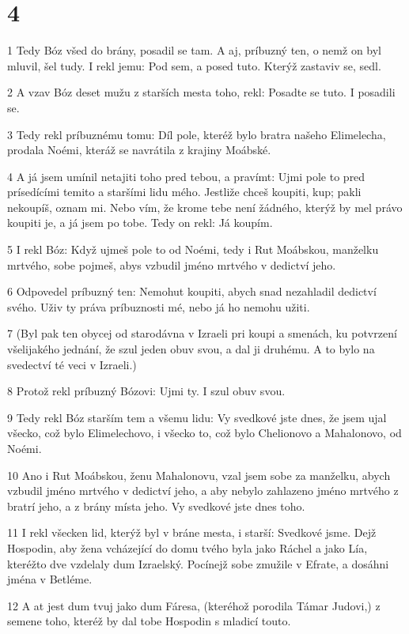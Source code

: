 \chapter{4}

\par 1 Tedy Bóz všed do brány, posadil se tam. A aj, príbuzný ten, o nemž on byl mluvil, šel tudy. I rekl jemu: Pod sem, a posed tuto. Kterýž zastaviv se, sedl.
\par 2 A vzav Bóz deset mužu z starších mesta toho, rekl: Posadte se tuto. I posadili se.
\par 3 Tedy rekl príbuznému tomu: Díl pole, kteréž bylo bratra našeho Elimelecha, prodala Noémi, kteráž se navrátila z krajiny Moábské.
\par 4 A já jsem umínil netajiti toho pred tebou, a pravímt: Ujmi pole to pred prísedícími temito a staršími lidu mého. Jestliže chceš koupiti, kup; pakli nekoupíš, oznam mi. Nebo vím, že krome tebe není žádného, kterýž by mel právo koupiti je, a já jsem po tobe. Tedy on rekl: Já koupím.
\par 5 I rekl Bóz: Když ujmeš pole to od Noémi, tedy i Rut Moábskou, manželku mrtvého, sobe pojmeš, abys vzbudil jméno mrtvého v dedictví jeho.
\par 6 Odpovedel príbuzný ten: Nemohut koupiti, abych snad nezahladil dedictví svého. Uživ ty práva príbuznosti mé, nebo já ho nemohu užiti.
\par 7 (Byl pak ten obycej od starodávna v Izraeli pri koupi a smenách, ku potvrzení všelijakého jednání, že szul jeden obuv svou, a dal ji druhému. A to bylo na svedectví té veci v Izraeli.)
\par 8 Protož rekl príbuzný Bózovi: Ujmi ty. I szul obuv svou.
\par 9 Tedy rekl Bóz starším tem a všemu lidu: Vy svedkové jste dnes, že jsem ujal všecko, což bylo Elimelechovo, i všecko to, což bylo Chelionovo a Mahalonovo, od Noémi.
\par 10 Ano i Rut Moábskou, ženu Mahalonovu, vzal jsem sobe za manželku, abych vzbudil jméno mrtvého v dedictví jeho, a aby nebylo zahlazeno jméno mrtvého z bratrí jeho, a z brány místa jeho. Vy svedkové jste dnes toho.
\par 11 I rekl všecken lid, kterýž byl v bráne mesta, i starší: Svedkové jsme. Dejž Hospodin, aby žena vcházející do domu tvého byla jako Ráchel a jako Lía, kteréžto dve vzdelaly dum Izraelský. Pocínejž sobe zmužile v Efrate, a dosáhni jména v Betléme.
\par 12 A at jest dum tvuj jako dum Fáresa, (kteréhož porodila Támar Judovi,) z semene toho, kteréž by dal tobe Hospodin s mladicí touto.
